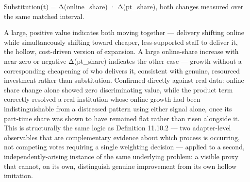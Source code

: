 \documentclass[
]{article}
\begin{document}
Substitution(t) = Δ(online\_share) · Δ(pt\_share), both changes measured
over the same matched interval.

A large, positive value indicates both moving together --- delivery
shifting online while simultaneously shifting toward cheaper,
less-supported staff to deliver it, the hollow, cost-driven version of
expansion. A large online-share increase with near-zero or negative
Δ(pt\_share) indicates the other case --- growth without a corresponding
cheapening of who delivers it, consistent with genuine, resourced
investment rather than substitution. Confirmed directly against real
data: online-share change alone showed zero discriminating value, while
the product term correctly resolved a real institution whose online
growth had been indistinguishable from a distressed pattern using either
signal alone, once its part-time share was shown to have remained flat
rather than risen alongside it. This is structurally the same logic as
Definition 11.10.2 --- two adapter-level observables that are
complementary evidence about which process is occurring, not competing
votes requiring a single weighting decision --- applied to a second,
independently-arising instance of the same underlying problem: a visible
proxy that cannot, on its own, distinguish genuine improvement from its
own hollow imitation.
\end{document}
